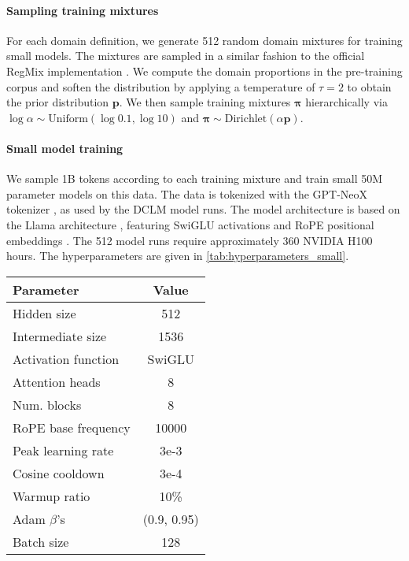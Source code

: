 \begin{minipage}[t]{0.63\linewidth}
\paragraph{Sampling training mixtures}
For each domain definition, we generate 512 random domain mixtures for training small models.
The mixtures are sampled in a similar fashion to the official RegMix implementation \citep{liu2024regmix}.
We compute the domain proportions in the pre-training corpus and soften the distribution by applying a temperature of $\tau = 2$ to obtain the prior distribution $\boldsymbol{p}$.
We then sample training mixtures $\boldsymbol{\pi}$ hierarchically via $\log \alpha \sim \text{Uniform}(\log 0.1, \log 10)$ and $\boldsymbol{\pi} \sim \text{Dirichlet}(\alpha \boldsymbol{p})$.

\vspace{\baselineskip}

\paragraph{Small model training}
We sample 1B tokens according to each training mixture and train small 50M parameter models on this data.
The data is tokenized with the GPT-NeoX tokenizer \citep{black2022gpt}, as used by the DCLM model runs.
The model architecture is based on the Llama architecture \citet{touvron2023llama}, featuring SwiGLU activations \citep{shazeer2020glu} and RoPE positional embeddings \citep{su2024roformer}.
The 512 model runs require approximately 360 NVIDIA H100 hours. The hyperparameters are given in \autoref{tab:hyperparameters_small}.

\end{minipage}\hfill
\begin{minipage}[t]{0.35\linewidth}
\centering
\vskip 0.1in
\label{tab:hyperparameters_small}
\icmlskip{0.1in}
\small
\begin{tabular}{lc}
\toprule
    Parameter & Value \\
    \midrule
    Hidden size & 512 \\
    Intermediate size & 1536 \\
    Activation function & SwiGLU \\
    Attention heads & 8 \\
    Num. blocks & 8 \\
    RoPE base frequency & 10000 \\
    \midrule
    Peak learning rate & 3e-3 \\
    Cosine cooldown & 3e-4 \\
    Warmup ratio & 10\% \\
    Adam $\beta$'s & (0.9, 0.95) \\
    Batch size & 128 \\
\bottomrule
\end{tabular}
\end{minipage}


